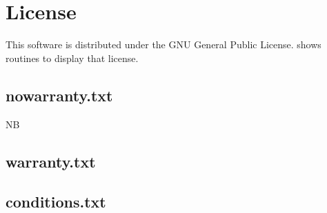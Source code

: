 \documentclass[twocolumn,global]{timlog/svjour}
\newcommand{\ME}{NB} %
\begin{document}

{\footnotesize }

\appendix

\section{License}\label{sec:license}

This software is distributed under the  GNU General Public License.
 shows routines to display that license.

\subsection{nowarranty.txt}\label{sec:nowar}
{\scriptsize \ME~ 

}

\subsection{warranty.txt}\label{sec:war}
{\scriptsize

}

\subsection{conditions.txt}\label{sec:cond}
{\scriptsize

}
\end{document}

